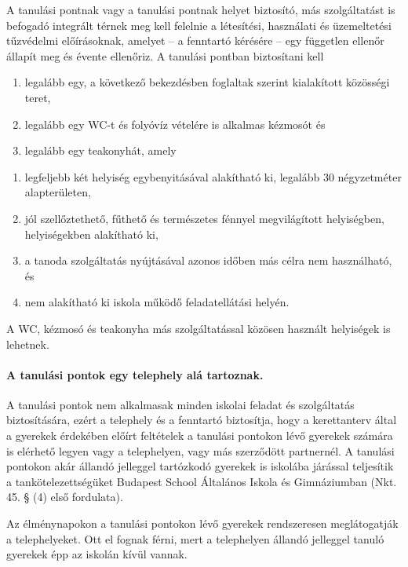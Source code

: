 A tanulási pontnak vagy a tanulási pontnak helyet biztosító, más szolgáltatást is befogadó integrált térnek meg kell felelnie a létesítési, használati és üzemeltetési tűzvédelmi előírásoknak, amelyet -- a fenntartó kérésére -- egy független ellenőr állapít meg és évente ellenőriz. A tanulási pontban biztosítani kell
\begin{enumerate}
    \item legalább egy, a következő bekezdésben foglaltak szerint kialakított közösségi teret,
    \item legalább egy WC-t és folyóvíz vételére is alkalmas kézmosót és
    \item  legalább egy teakonyhát, amely
\end{enumerate}
\begin{enumerate}
    \item legfeljebb két helyiség egybenyitásával alakítható ki, legalább 30 négyzetméter alapterületen,
    \item jól szellőztethető, fűthető és természetes fénnyel megvilágított helyiségben, helyiségekben alakítható ki,
    \item a tanoda szolgáltatás nyújtásával azonos időben más célra nem használható, és
    \item nem alakítható ki iskola működő feladatellátási helyén.
\end{enumerate}

A WC, kézmosó és teakonyha más szolgáltatással közösen használt helyiségek is lehetnek.

\paragraph{A tanulási pontok egy telephely alá tartoznak.}

A tanulási pontok nem alkalmasak minden iskolai feladat és szolgáltatás biztosítására, ezért a telephely és a fenntartó biztosítja, hogy a kerettanterv által a gyerekek érdekében előírt feltételek a tanulási pontokon lévő gyerekek számára is elérhető legyen vagy a telephelyen, vagy más szerződött partnernél. A tanulási pontokon akár állandó jelleggel tartózkodó gyerekek is iskolába járással teljesítik a tankötelezettségüket Budapest School Általános Iskola és Gimnáziumban (Nkt. 45. § (4) első fordulata).

Az élménynapokon a tanulási pontokon lévő gyerekek rendszeresen meglátogatják a telephelyeket. Ott el fognak férni, mert a telephelyen állandó jelleggel tanuló gyerekek épp az iskolán kívül vannak. 

